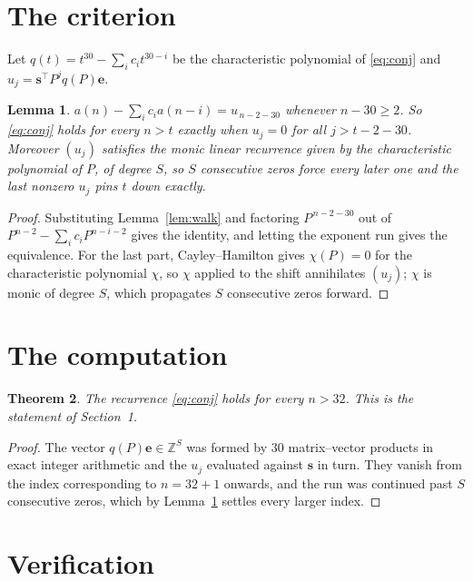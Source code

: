 \documentclass[11pt,a4paper]{article}
\theoremstyle{plain}
\newtheorem{theorem}{Theorem}
\newtheorem{lemma}[theorem]{Lemma}
\theoremstyle{definition}
\begin{document}
\section{The criterion}

Let $q(t)=t^{30}-\sum_i c_i t^{30-i}$ be the characteristic polynomial of
\eqref{eq:conj} and $u_j=\mathbf{s}^{\!\top}P^{j}q(P)\mathbf{e}$.

\begin{lemma}\label{lem:crit}
$a(n)-\sum_i c_i a(n-i)=u_{\,n-2-30}$ whenever $n-30\ge2$. So \eqref{eq:conj}
holds for every $n>t$ exactly when $u_j=0$ for all $j>t-2-30$. Moreover $(u_j)$
satisfies the monic linear recurrence given by the characteristic polynomial of $P$, of
degree $S$, so $S$ consecutive zeros force every later one and the last nonzero $u_j$ pins
$t$ down exactly.
\end{lemma}

\begin{proof}
Substituting Lemma~\ref{lem:walk} and factoring $P^{\,n-2-30}$ out of
$P^{n-2}-\sum_i c_i P^{n-i-2}$ gives the identity, and letting the exponent run gives the
equivalence. For the last part, Cayley--Hamilton gives $\chi(P)=0$ for the characteristic
polynomial $\chi$, so $\chi$ applied to the shift annihilates $(u_j)$; $\chi$ is monic of
degree $S$, which propagates $S$ consecutive zeros forward.
\end{proof}

\section{The computation}

\begin{theorem}
The recurrence \eqref{eq:conj} holds for every $n>32$. This is the statement of
Section~1.
\end{theorem}

\begin{proof}
The vector $q(P)\mathbf{e}\in\mathbb{Z}^{S}$ was formed by $30$ matrix--vector
products in exact integer arithmetic and the $u_j$ evaluated against $\mathbf{s}$ in turn.
They vanish from the index corresponding to $n=32+1$ onwards, and the run was continued
past $S$ consecutive zeros, which by Lemma~\ref{lem:crit} settles every larger index.
\end{proof}

\section{Verification}
\end{document}
